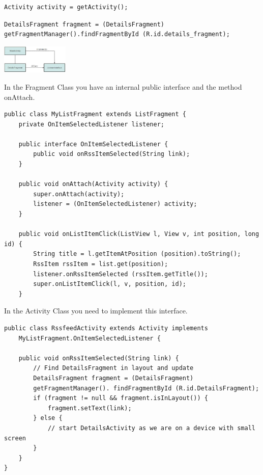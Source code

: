 \begin{breakbox}

\begin{lstlisting}
Activity activity = getActivity();
\end{lstlisting}
\end{breakbox}

\begin{breakbox}

\begin{lstlisting}
DetailsFragment fragment = (DetailsFragment) getFragmentManager().findFragmentById (R.id.details_fragment);
\end{lstlisting}
\end{breakbox}

\begin{breakbox}

\includegraphics[width=0.24\textwidth]{figures/decouplingFragments.png}

In the Fragment Class you have an internal public interface and
the method onAttach.

\begin{lstlisting}
public class MyListFragment extends ListFragment {
    private OnItemSelectedListener listener;

    public interface OnItemSelectedListener {
        public void onRssItemSelected(String link);
    }

    public void onAttach(Activity activity) {
        super.onAttach(activity);
        listener = (OnItemSelectedListener) activity;
    }

    public void onListItemClick(ListView l, View v, int position, long id) {
        String title = l.getItemAtPosition (position).toString();
        RssItem rssItem = list.get(position);
        listener.onRssItemSelected (rssItem.getTitle());
        super.onListItemClick(l, v, position, id);
    }
\end{lstlisting}

In the Activity Class you need to implement this interface.

\begin{lstlisting}
public class RssfeedActivity extends Activity implements
    MyListFragment.OnItemSelectedListener {

    public void onRssItemSelected(String link) {
        // Find DetailsFragment in layout and update
        DetailsFragment fragment = (DetailsFragment)
        getFragmentManager(). findFragmentById (R.id.DetailsFragment);
        if (fragment != null && fragment.isInLayout()) {
            fragment.setText(link);
        } else {
            // start DetailsActivity as we are on a device with small screen
        }
    }
}
\end{lstlisting}
\end{breakbox}

